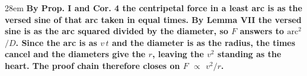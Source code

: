 \documentclass[border=4pt]{standalone}
\begin{document}
\begin{varwidth}{28em}
\large\bfseries
By Prop. I and Cor. 4 the centripetal force in a least arc is as the versed sine of that arc taken in equal times. By Lemma VII the versed sine is as the arc squared divided by the diameter, so $F$ answers to $\text{arc}^2$$/D$. Since the arc is as $v\,t$ and the diameter is as the radius, the times cancel and the diameters give the $r$, leaving the $v^2$ standing as the heart. The proof chain therefore closes on $F$ $\propto$ $v^2$$/$$r$.
\end{varwidth}
\end{document}
